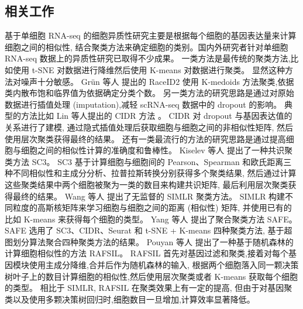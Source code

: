 \subsection{相关工作}

基于单细胞 RNA-seq 的细胞异质性研究主要是根据每个细胞的基因表达量来计算细胞之间的相似性,
结合聚类方法来确定细胞的类别。国内外研究者针对单细胞 RNA-seq 数据上的异质性研究已取得不少成果。
一类方法是最传统的聚类方法,比如使用 t-SNE 对数据进行降维然后使用 K-means 对数据进行聚类。
显然这种方法对噪声十分敏感。
Gr{\"u}n 等人 \cite{grun2016novo} 提出的 RaceID2 
使用 K-medoids 方法聚类,依据类内散布饱和临界值为依据确定分类个数。
另一类方法的研究思路是通过对原始数据进行插值处理 (imputation),减轻 scRNA-seq 数据中的 dropout 的影响。
典型的方法比如 Lin 等人提出的 CIDR 方法 \cite{lin2017cidr}。
CIDR 对 dropout 与基因表达值的关系进行了建模, 通过隐式插值处理后获取细胞与细胞之间的非相似性矩阵,
然后使用层次聚类获得最终的结果。
还有一类最流行的方法的研究思路是通过提高细胞与细胞之间的相似性计算的准确度和鲁棒性。
Kiselev 等人 \cite{kiselev2017sc3} 提出了一种共识聚类方法 SC3。
SC3 基于计算细胞与细胞间的 Pearson、Spearman 和欧氏距离三种不同相似性和主成分分析、拉普拉斯转换分别获得多个聚类结果,
然后通过计算这些聚类结果中两个细胞被聚为一类的数目来构建共识矩阵,
最后利用层次聚类获得最终的结果。
Wang 等人 \cite{wang2018simlr} 提出了无监督的 SIMLR 聚类方法。
SIMLR 构建不同粒度的高斯核矩阵来学习细胞与细胞之间的距离 (相似性) 矩阵,
并使用已有的比如 K-means 来获得每个细胞的类型。
Yang 等人 \cite{yang2018safe} 提出了聚合聚类方法 SAFE。
SAFE 选用了 SC3、CIDR、Seurat 和 t-SNE + K-means 四种聚类方法,
基于超图划分算法聚合四种聚类方法的结果。
Pouyan 等人 \cite{pouyan2018random} 提出了一种基于随机森林的计算细胞相似性的方法 RAFSIL。
RAFSIL 首先对基因过滤和聚类,接着对每个基因模块使用主成分降维,合并后作为随机森林的输入,
根据两个细胞落入同一颗决策树叶子上的数目计算细胞的相似性,然后使用层次聚类或者 K-means 获取每个细胞的类型。
相比于 SIMLR, RAFSIL 在聚类效果上有一定的提高,
但由于对基因聚类以及使用多颗决策树回归时,细胞数目一旦增加,计算效率显著降低。


